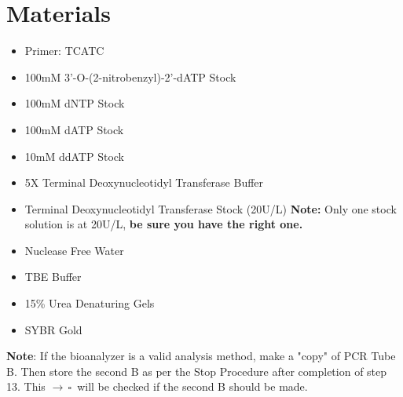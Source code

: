 \documentclass[letterpaper]{article}
\newcommand{\tdt}{Terminal Deoxynucleotidyl Transferase}
\newcommand{\uL}{\micro{}L}
\newcommand{\BdATP}{3'-O-(2-nitrobenzyl)-2'-dATP}
\begin{document}
\section{Materials}
\begin{itemize}
\item{Primer: TCATC}
\item{100mM \BdATP{} Stock}
\item{100mM dNTP Stock}
\item{100mM dATP Stock}
\item{10mM ddATP Stock}
\item{5X \tdt{} Buffer}
\item{\tdt{} Stock (20U/\uL{})}
\textbf{Note:} Only one stock solution is at 20U/\uL{}, \textbf{be sure you have the right one.}
\item{Nuclease Free Water}
\item{TBE Buffer}
\item{15\% Urea Denaturing Gels}
\item{SYBR Gold}
\end{itemize}

\textbf{Note}: If the bioanalyzer is a valid analysis method, make a "copy" of PCR Tube B. Then store the second B as per the Stop Procedure after completion of step 13. This $\rightarrow\,\square\,$ will be checked if the second B should be made.
\end{document}
